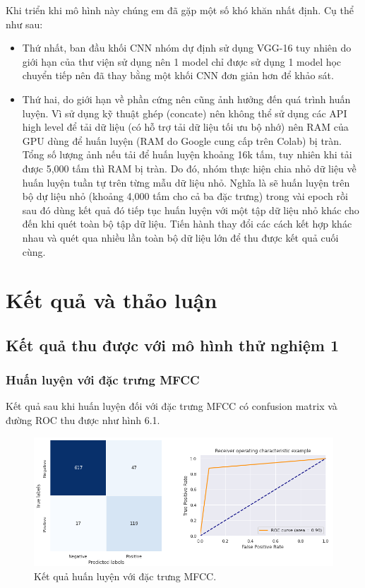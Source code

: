 \documentclass[a4paper, 12pt]{article}
\begin{document}
\noindent
Khi triển khi mô hình này chúng em đã gặp một số khó khăn nhất định. Cụ thể như sau:

\begin{itemize}
    \item Thứ nhất, ban đầu khối CNN nhóm dự định sử dụng VGG-16 tuy nhiên do giới hạn của thư viện sử dụng nên 1 model chỉ được sử dụng 1 model học chuyển tiếp nên đã thay bằng một khối CNN đơn giản hơn để khảo sát.
    \item Thứ hai, do giới hạn về phần cứng nên cũng ảnh hưởng đến quá trình huấn luyện. Vì sử dụng kỹ thuật ghép (concate) nên không thể sử dụng các API high level để tải dữ liệu (có hỗ trợ tải dữ liệu tối ưu bộ nhớ) nên RAM của GPU dùng để huấn luyện (RAM do Google cung cấp trên Colab) bị tràn. Tổng số lượng ảnh nếu tải để huấn luyện khoảng 16k tấm, tuy nhiên khi tải được 5,000 tấm thì RAM bị tràn. Do đó, nhóm thực hiện chia nhỏ dữ liệu về huấn luyện tuần tự trên từng mẫu dữ liệu nhỏ. Nghĩa là sẽ huấn luyện trên bộ dự liệu nhỏ (khoảng 4,000 tấm cho cả ba đặc trưng) trong vài epoch rồi sau đó dùng kết quả đó tiếp tục huấn luyện với một tập dữ liệu nhỏ khác cho đến khi quét toàn bộ tập dữ liệu. Tiến hành thay đổi các cách kết hợp khác nhau và quét qua nhiều lần toàn bộ dữ liệu lớn để thu được kết quả cuối cùng.\\
\end{itemize}


\section{Kết quả và thảo luận}


\subsection{Kết quả thu được với mô hình thử nghiệm 1}

\subsubsection{Huấn luyện với đặc trưng MFCC}

\noindent
Kết quả sau khi huấn luyện đối với đặc trưng MFCC có confusion matrix và đường ROC thu được như hình 6.1.

\begin{figure}[!h]
\captionsetup{width=0.8\textwidth}
\centering
\includegraphics[width=17cm]{images/5.1.png}
\caption{Kết quả huấn luyện với đặc trưng MFCC.}
\end{figure}
\end{document}
